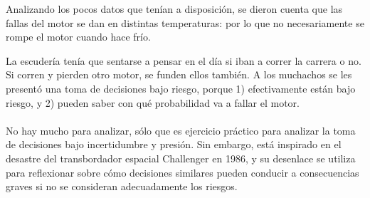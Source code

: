 \documentclass{article}
\begin{document}
            Analizando los pocos datos que tenían a disposición, se dieron cuenta que las fallas del motor se dan en distintas temperaturas: por lo que no necesariamente se rompe el motor cuando hace frío.

            La escudería tenía que sentarse a pensar en el día si iban a correr la carrera o no. Si corren y pierden otro motor, se funden ellos también. A los muchachos se les presentó una toma de decisiones bajo riesgo, porque 1) efectivamente están bajo riesgo, y 2) pueden saber con qué probabilidad va a fallar el motor.
            \\
            \\
            No hay mucho para analizar, sólo que es ejercicio práctico para analizar la toma de decisiones bajo incertidumbre y presión. Sin embargo, está inspirado en el desastre del transbordador espacial Challenger en 1986, y su desenlace se utiliza para reflexionar sobre cómo decisiones similares pueden conducir a consecuencias graves si no se consideran adecuadamente los riesgos.
\end{document}

